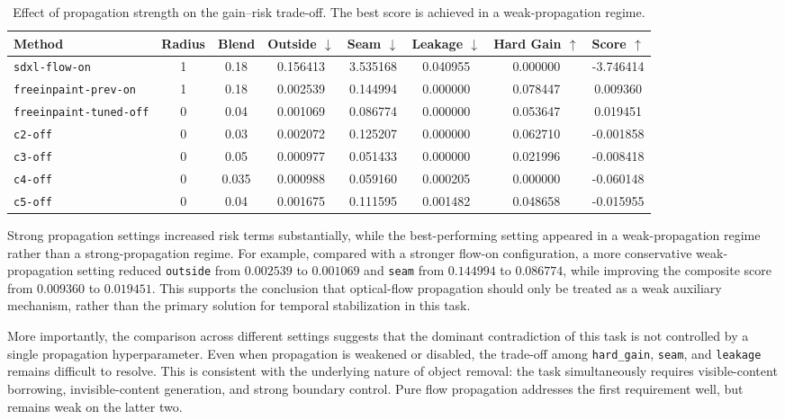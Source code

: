 \begin{table}[t]
\centering
\small
\setlength{\tabcolsep}{4pt}
\caption{Effect of propagation strength on the gain--risk trade-off. The best score is achieved in a weak-propagation regime.}
\label{tab:flow_failure}
\begin{tabular}{lccccccc}
\toprule
Method & Radius & Blend & Outside $\downarrow$ & Seam $\downarrow$ & Leakage $\downarrow$ & Hard Gain $\uparrow$ & Score $\uparrow$ \\
\midrule
\texttt{sdxl-flow-on}          & 1 & 0.18  & 0.156413 & 3.535168 & 0.040955 & 0.000000 & -3.746414 \\
\texttt{freeinpaint-prev-on}   & 1 & 0.18  & 0.002539 & 0.144994 & 0.000000 & 0.078447 & 0.009360 \\
\texttt{freeinpaint-tuned-off} & 0 & 0.04  & 0.001069 & 0.086774 & 0.000000 & 0.053647 & 0.019451 \\
\texttt{c2-off}                & 0 & 0.03  & 0.002072 & 0.125207 & 0.000000 & 0.062710 & -0.001858 \\
\texttt{c3-off}                & 0 & 0.05  & 0.000977 & 0.051433 & 0.000000 & 0.021996 & -0.008418 \\
\texttt{c4-off}                & 0 & 0.035 & 0.000988 & 0.059160 & 0.000205 & 0.000000 & -0.060148 \\
\texttt{c5-off}                & 0 & 0.04  & 0.001675 & 0.111595 & 0.001482 & 0.048658 & -0.015955 \\
\bottomrule
\end{tabular}
\end{table}

Strong propagation settings increased risk terms substantially, while the best-performing setting appeared in a weak-propagation regime rather than a strong-propagation regime.
For example, compared with a stronger flow-on configuration, a more conservative weak-propagation setting reduced \texttt{outside} from \(0.002539\) to \(0.001069\) and \texttt{seam} from \(0.144994\) to \(0.086774\), while improving the composite score from \(0.009360\) to \(0.019451\).
This supports the conclusion that optical-flow propagation should only be treated as a weak auxiliary mechanism, rather than the primary solution for temporal stabilization in this task.

More importantly, the comparison across different settings suggests that the dominant contradiction of this task is not controlled by a single propagation hyperparameter.
Even when propagation is weakened or disabled, the trade-off among \texttt{hard\_gain}, \texttt{seam}, and \texttt{leakage} remains difficult to resolve.
This is consistent with the underlying nature of object removal: the task simultaneously requires visible-content borrowing, invisible-content generation, and strong boundary control.
Pure flow propagation addresses the first requirement well, but remains weak on the latter two.

